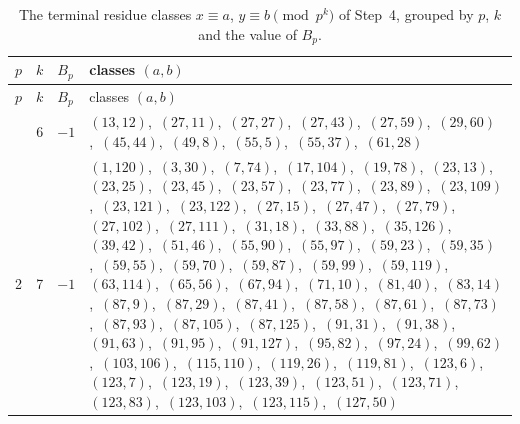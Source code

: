 \documentclass[11pt]{article}
\begin{document}
\begingroup\small
\setlength{\LTcapwidth}{\textwidth}
\begin{longtable}{@{}rrl>{\raggedright\arraybackslash}p{}@{}}
\caption{The terminal residue classes $x\equiv a$, $y\equiv b\pmod{p^k}$ of Step~4, grouped by $p$, $k$ and the value of $B_p$.}\label{tab:local}\\
\hline $p$ & $k$ & $B_p$ & classes $(a,b)$\\\hline\endfirsthead
\hline $p$ & $k$ & $B_p$ & classes $(a,b)$\\\hline\endhead\hline\endfoot
2 & 6 & $-1$ & $(13,12)$,\allowbreak\ $(27,11)$,\allowbreak\ $(27,27)$,\allowbreak\ $(27,43)$,\allowbreak\ $(27,59)$,\allowbreak\ $(29,60)$,\allowbreak\ $(45,44)$,\allowbreak\ $(49,8)$,\allowbreak\ $(55,5)$,\allowbreak\ $(55,37)$,\allowbreak\ $(61,28)$\\
2 & 7 & $-1$ & $(1,120)$,\allowbreak\ $(3,30)$,\allowbreak\ $(7,74)$,\allowbreak\ $(17,104)$,\allowbreak\ $(19,78)$,\allowbreak\ $(23,13)$,\allowbreak\ $(23,25)$,\allowbreak\ $(23,45)$,\allowbreak\ $(23,57)$,\allowbreak\ $(23,77)$,\allowbreak\ $(23,89)$,\allowbreak\ $(23,109)$,\allowbreak\ $(23,121)$,\allowbreak\ $(23,122)$,\allowbreak\ $(27,15)$,\allowbreak\ $(27,47)$,\allowbreak\ $(27,79)$,\allowbreak\ $(27,102)$,\allowbreak\ $(27,111)$,\allowbreak\ $(31,18)$,\allowbreak\ $(33,88)$,\allowbreak\ $(35,126)$,\allowbreak\ $(39,42)$,\allowbreak\ $(51,46)$,\allowbreak\ $(55,90)$,\allowbreak\ $(55,97)$,\allowbreak\ $(59,23)$,\allowbreak\ $(59,35)$,\allowbreak\ $(59,55)$,\allowbreak\ $(59,70)$,\allowbreak\ $(59,87)$,\allowbreak\ $(59,99)$,\allowbreak\ $(59,119)$,\allowbreak\ $(63,114)$,\allowbreak\ $(65,56)$,\allowbreak\ $(67,94)$,\allowbreak\ $(71,10)$,\allowbreak\ $(81,40)$,\allowbreak\ $(83,14)$,\allowbreak\ $(87,9)$,\allowbreak\ $(87,29)$,\allowbreak\ $(87,41)$,\allowbreak\ $(87,58)$,\allowbreak\ $(87,61)$,\allowbreak\ $(87,73)$,\allowbreak\ $(87,93)$,\allowbreak\ $(87,105)$,\allowbreak\ $(87,125)$,\allowbreak\ $(91,31)$,\allowbreak\ $(91,38)$,\allowbreak\ $(91,63)$,\allowbreak\ $(91,95)$,\allowbreak\ $(91,127)$,\allowbreak\ $(95,82)$,\allowbreak\ $(97,24)$,\allowbreak\ $(99,62)$,\allowbreak\ $(103,106)$,\allowbreak\ $(115,110)$,\allowbreak\ $(119,26)$,\allowbreak\ $(119,81)$,\allowbreak\ $(123,6)$,\allowbreak\ $(123,7)$,\allowbreak\ $(123,19)$,\allowbreak\ $(123,39)$,\allowbreak\ $(123,51)$,\allowbreak\ $(123,71)$,\allowbreak\ $(123,83)$,\allowbreak\ $(123,103)$,\allowbreak\ $(123,115)$,\allowbreak\ $(127,50)$\\

\end{longtable}
\end{document}
